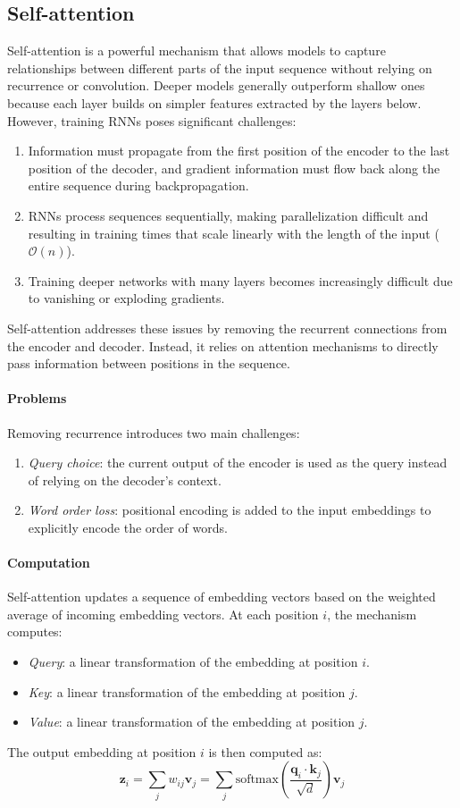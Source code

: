 \subsection{Self-attention}
Self-attention is a powerful mechanism that allows models to capture relationships between different parts of the input sequence without relying on recurrence or convolution.
Deeper models generally outperform shallow ones because each layer builds on simpler features extracted by the layers below. 
However, training RNNs poses significant challenges:
\begin{enumerate}
    \item Information must propagate from the first position of the encoder to the last position of the decoder, and gradient information must flow back along the entire sequence during backpropagation.
    \item RNNs process sequences sequentially, making parallelization difficult and resulting in training times that scale linearly with the length of the input ($\mathcal{O}(n)$). 
    \item Training deeper networks with many layers becomes increasingly difficult due to vanishing or exploding gradients.
\end{enumerate}
\noindent Self-attention addresses these issues by removing the recurrent connections from the encoder and decoder. 
Instead, it relies on attention mechanisms to directly pass information between positions in the sequence.

\paragraph{Problems}
Removing recurrence introduces two main challenges:
\begin{enumerate}
    \item \textit{Query choice}: the current output of the encoder is used as the query instead of relying on the decoder's context.
    \item \textit{Word order loss}: positional encoding is added to the input embeddings to explicitly encode the order of words.
\end{enumerate}

\paragraph*{Computation}
Self-attention updates a sequence of embedding vectors based on the weighted average of incoming embedding vectors. 
At each position $i$, the mechanism computes:
\begin{itemize}
    \item \textit{Query}: a linear transformation of the embedding at position $i$.
    \item \textit{Key}: a linear transformation of the embedding at position $j$.
    \item \textit{Value}: a linear transformation of the embedding at position $j$.
\end{itemize}
\noindent The output embedding at position $i$ is then computed as:
\[\textbf{z}_i=\sum_jw_{ij}\textbf{v}_j =\sum_j\text{softmax}\left(\dfrac{\textbf{q}_{i}\cdot\textbf{k}_j}{\sqrt{d}}\right)\textbf{v}_j\]

